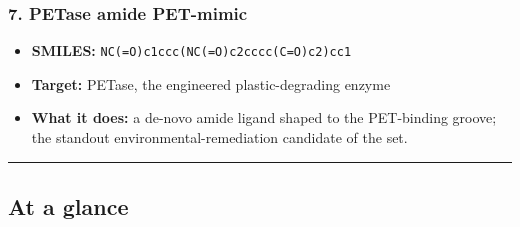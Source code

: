 \documentclass[12pt,a4paper]{article}
\begin{document}
\hypertarget{petase-amide-pet-mimic}{%
\subsubsection{7. PETase amide PET-mimic}\label{petase-amide-pet-mimic}}

\begin{itemize}
\tightlist
\item
  \textbf{SMILES:} \texttt{NC(=O)c1ccc(NC(=O)c2cccc(C=O)c2)cc1}
\item
  \textbf{Target:} PETase, the engineered plastic-degrading enzyme
\item
  \textbf{What it does:} a de-novo amide ligand shaped to the
  PET-binding groove; the standout environmental-remediation candidate
  of the set.
\end{itemize}

\begin{center}\rule{0.5\linewidth}{0.5pt}\end{center}

\hypertarget{at-a-glance}{%
\subsection{At a glance}\label{at-a-glance}}
\end{document}
